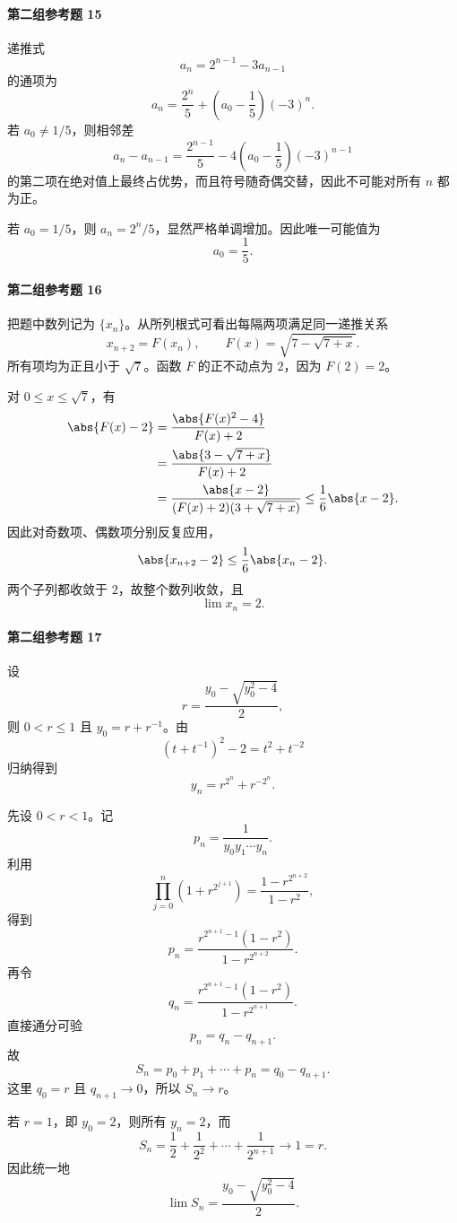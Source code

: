 \paragraph{第二组参考题 15}
\begin{xsolution}
递推式
\[
  a_n=2^{n-1}-3a_{n-1}
\]
的通项为
\[
  a_n=\frac{2^n}{5}+\left(a_0-\frac15\right)(-3)^n.
\]
若 $a_0\ne1/5$，则相邻差
\[
  a_n-a_{n-1}
  =\frac{2^{n-1}}5-4\left(a_0-\frac15\right)(-3)^{n-1}
\]
的第二项在绝对值上最终占优势，而且符号随奇偶交替，因此不可能对所有 $n$ 都为正。

若 $a_0=1/5$，则 $a_n=2^n/5$，显然严格单调增加。因此唯一可能值为
\[
  \boxed{a_0=\frac15}.
\]
\end{xsolution}

\paragraph{第二组参考题 16}
\begin{xsolution}
把题中数列记为 $\{x_n\}$。从所列根式可看出每隔两项满足同一递推关系
\[
  x_{n+2}=F(x_n),
  \qquad
  F(x)=\sqrt{7-\sqrt{7+x}}.
\]
所有项均为正且小于 $\sqrt7$。函数 $F$ 的正不动点为 $2$，因为 $F(2)=2$。

对 $0\le x\le\sqrt7$，有
\begin{align*}
  \abs{F(x)-2}
  &=\frac{\abs{F(x)^2-4}}{F(x)+2}\\
  &=\frac{\abs{3-\sqrt{7+x}}}{F(x)+2}\\
  &=\frac{\abs{x-2}}
  {(F(x)+2)(3+\sqrt{7+x})}
  \le\frac16\abs{x-2}.
\end{align*}
因此对奇数项、偶数项分别反复应用，
\[
  \abs{x_{n+2}-2}\le\frac16\abs{x_n-2}.
\]
两个子列都收敛于 $2$，故整个数列收敛，且
\[
  \boxed{\lim x_n=2}.
\]
\end{xsolution}

\paragraph{第二组参考题 17}
\begin{xsolution}
设
\[
  r=\frac{y_0-\sqrt{y_0^2-4}}2,
\]
则 $0<r\le1$ 且 $y_0=r+r^{-1}$。由
\[
  (t+t^{-1})^2-2=t^2+t^{-2}
\]
归纳得到
\[
  y_n=r^{2^n}+r^{-2^n}.
\]

先设 $0<r<1$。记
\[
  p_n=\frac1{y_0y_1\cdots y_n}.
\]
利用
\[
  \prod_{j=0}^n(1+r^{2^{j+1}})
  =\frac{1-r^{2^{n+2}}}{1-r^2},
\]
得到
\[
  p_n=\frac{r^{2^{n+1}-1}(1-r^2)}{1-r^{2^{n+2}}}.
\]
再令
\[
  q_n=\frac{r^{2^{n+1}-1}(1-r^2)}{1-r^{2^{n+1}}}.
\]
直接通分可验
\[
  p_n=q_n-q_{n+1}.
\]
故
\[
  S_n=p_0+p_1+\cdots+p_n=q_0-q_{n+1}.
\]
这里 $q_0=r$ 且 $q_{n+1}\to0$，所以 $S_n\to r$。

若 $r=1$，即 $y_0=2$，则所有 $y_n=2$，而
\[
  S_n=\frac12+\frac1{2^2}+\cdots+\frac1{2^{n+1}}\to1=r.
\]
因此统一地
\[
  \boxed{\lim S_n=\frac{y_0-\sqrt{y_0^2-4}}{2}}.
\]
\end{xsolution}

